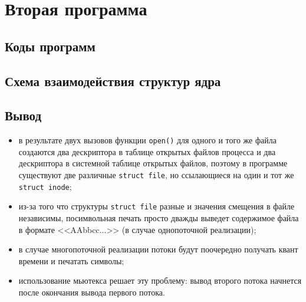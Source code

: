 \section{Вторая программа}

\subsection{Коды программ}





\clearpage



\clearpage

\subsection{Схема взаимодействия структур ядра}


\subsection*{Вывод}

\begin{itemize}
	\item в результате двух вызовов функции \texttt{open()} для одного и того же файла создаются два дескриптора в таблице открытых файлов процесса и два дескриптора в системной таблице открытых файлов, поэтому в программе существуют две различные \texttt{struct file}, но ссылающиеся на один и тот же \texttt{struct inode};
	\item из-за того что структуры \texttt{struct file} разные и значения смещения в файле независимы, посимвольная печать просто дважды выведет содержимое файла в формате <<AAbbcc...>> (в случае однопоточной реализации); 
	\item в случае многопоточной реализации потоки будут поочередно получать квант времени и печатать символы;
	\item использование мьютекса решает эту проблему: вывод второго потока начнется после окончания вывода первого потока.
\end{itemize}

